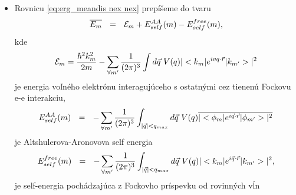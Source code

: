 \documentclass[
	11pt, %
]{beamer}
\begin{document}
\begin{frame}

\begin{itemize}
\item Rovnicu \eqref{eq:erg_meandis nex nex} prepíšeme do tvaru
\begin{equation}\label{eq:erg_meandis nex prepis skratka}
 \overline{E_m} \ \ = \ \ \mathcal{E}_m + E_{self}^{AA}(m) - E_{self}^{free}(m)  \text{,}
\end{equation}
kde
\begin{equation}\label{eq:erg_volna castica s ee}
\mathcal{E}_m = \frac{\hbar^2 k_m^2}{2m} - \sum_{\forall m'} \frac{1}{(2\pi)^{3}} \int d\vec{q}\ V(q) |<k_m|e^{ivq\cdot\vec{r}}|k_{m'}>|^2  \text{}
\end{equation}
je energia voľného elektrónu interagujúceho s ostatnými cez tienenú Fockovu e-e interakciu,
\begin{equation}\label{eq:erg_self AA}
 E_{self}^{AA}(m) \ \ = \ \  -\sum_{\forall m'} \frac{1}{(2\pi)^{3}} \int_{|\vec{q}| < q_{max}} d\vec{q}\ V(q) \overline{|<\phi_m|e^{i\vec{q}\cdot\vec{r}}|\phi_{m'}>|^2}  \text{}
\end{equation}
je Altshulerova-Aronovova self energia
\begin{equation}\label{eq:erg_self free}
 E_{self}^{free}(m) \ \ =  \ \  - \sum_{\forall m'} \frac{1}{(2\pi)^{3}} \int_{|\vec{q}| < q_{max}} d\vec{q}\ V(q) |<k_m|e^{i\vec{q}\cdot\vec{r}}|k_{m'}>|^2\text{,}
\end{equation}
je self-energia pochádzajúca z Fockovho príspevku od rovinných vĺn
\end{itemize}
\end{frame}
\end{document}
